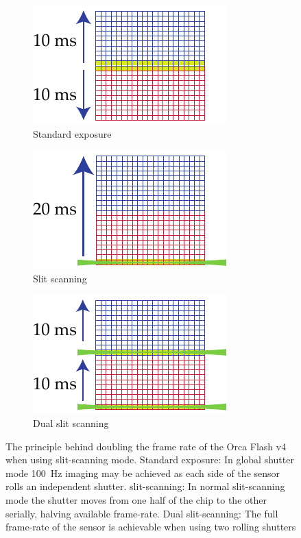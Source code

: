 \begin{figure}
  \centering
  \begin{subfigure}[t]{0.32\linewidth}
        \centering
        \includegraphics{dual_slit_scanning/standard}
        \caption{Standard exposure}\label{fig:dual_slit_scanning/standard}
  \end{subfigure}\hfill
  \begin{subfigure}[t]{0.32\linewidth}
        \centering
        \includegraphics{dual_slit_scanning/single_slit}
        \caption{Slit scanning}\label{fig:dual_slit_scanning/single_slit}
  \end{subfigure}\hfill
  \begin{subfigure}[t]{0.32\linewidth}
        \centering
        \includegraphics{dual_slit_scanning/dual_slit}
        \caption{Dual slit scanning}\label{fig:dual_slit_scanning/dual_slit}
  \end{subfigure}
  \caption[The principle behind doubling the frame rate of the Orca Flash v4 when using \gls{slit-scanning} mode]{
  The principle behind doubling the frame rate of the Orca Flash v4 when using \gls{slit-scanning} mode.
  Standard exposure: In global shutter mode \SI{100}{\hertz} imaging may be achieved as each side of the sensor rolls an independent shutter.
  \Gls{slit-scanning}: In normal \gls{slit-scanning} mode the shutter moves from one half of the chip to the other serially, halving available frame-rate.
  Dual \gls{slit-scanning}:
  The full frame-rate of the sensor is achievable when using two rolling shutters
  }\label{fig:dual_slit_scanning}
\end{figure}

